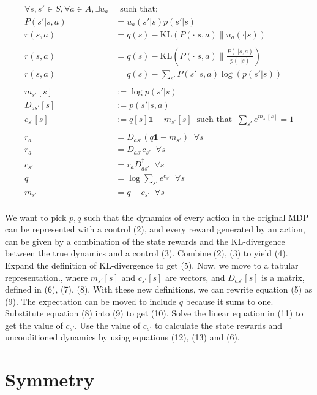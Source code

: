 \begin{align*}
\forall s, s' \in S, \forall a \in A, \exists u_a& \;\;\text{such that;} \tag{1}\\
P(s' | s, a) &= u_a(s'|s)p(s'|s) \tag{2}\\
r(s, a) &= q(s) - \text{KL}(P(\cdot | s, a) \parallel u_a(\cdot| s) ) \tag{3}\\
\\
r(s, a) &= q(s) - \text{KL}(P(\cdot | s, a)\parallel\frac{P(\cdot | s, a)}{p(\cdot|s)}) \tag{4}\\
r(s, a) &= q(s) - \sum_{s'}P(s' | s, a) \log(p(s'|s)) \tag{5}\\
\\
m_{s'}[s]&:= \log p(s' | s) \tag{6}\\
D_{as'}[s] &:= p(s'|s, a) \tag{7}\\
c_{s'}[s] &:= q[s] \mathbf 1 - m_{s'}[s] \;\;\text{such that} \;\; \sum_{s'} e^{m_{s'}[s]} = 1 \tag{8}\\
\\
r_a &= D_{as'} ( q \mathbf 1 - m_{s'}) \;\;\forall s \tag{9}\\
r_a &= D_{as'}c_{s'}  \;\;\forall s \tag{10}\\
c_{s'} &= r_aD_{as'}^{\dagger} \;\;\forall s\tag{11}\\
q &= \log \sum_{s'} e^{c_{s'}} \;\;\forall s\tag{12}\\
m_{s'} &= q - c_{s'} \;\;\forall s\tag{13}\\
\end{align*}

We want to pick $p, q$ such that the dynamics of every action in the original MDP can be represented with a control (2),
and every reward generated by an action, can be given by a combination of the
state rewards and the $\text{KL}$-divergence between the true dynamics and a control (3).
Combine (2), (3) to yield (4). Expand the definition of $\text{KL}$-divergence to get (5).
Now, we move to a tabular representation., where $m_{s'}[s]$ and $c_{s'}[s]$ are vectors, and
$D_{as'}[s]$ is a matrix, defined in (6), (7), (8). With these new definitions, we can rewrite equation (5)
as (9). The expectation can be moved to include $q$ because it sums to one.
Substitute equation (8) into (9) to get (10). Solve the linear equation in (11) to get the value of $c_{s'}$.
Use the value of $c_{s'}$ to calculate the state rewards and unconditioned dynamics by using equations (12), (13) and (6).

\section{Symmetry}

